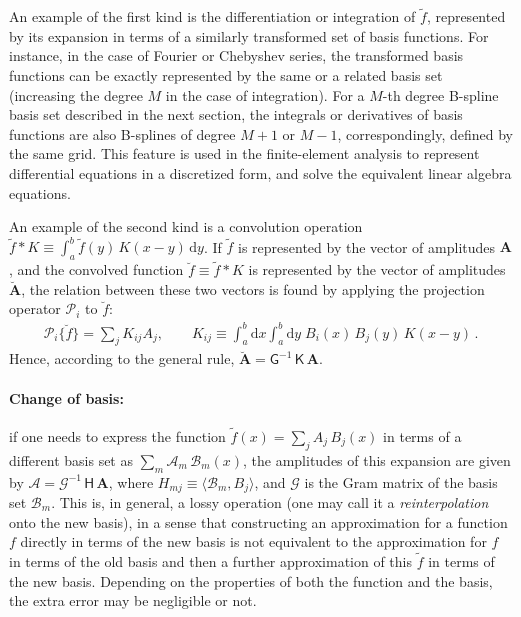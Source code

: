 \documentclass[12pt]{article}
\renewcommand{\d}{\mathrm{d}}
\begin{document}
An example of the first kind is the differentiation or integration of $\tilde f$, represented by its expansion in terms of a similarly transformed set of basis functions. For instance, in the case of Fourier or Chebyshev series, the transformed basis functions can be exactly represented by the same or a related basis set (increasing the degree $M$ in the case of integration). For a $M$-th degree B-spline basis set described in the next section, the integrals or derivatives of basis functions are also B-splines of degree $M+1$ or $M-1$, correspondingly, defined by the same grid. This feature is used in the finite-element analysis to represent differential equations in a discretized form, and solve the equivalent linear algebra equations.

An example of the second kind is a convolution operation $\tilde f \ast K \equiv \int_a^b \tilde f(y)\, K(x-y)\, \d y$. If $\tilde f$ is represented by the vector of amplitudes $\boldsymbol A$, and the convolved function $\breve f \equiv \tilde f \ast K$ is represented by the vector of amplitudes $\boldsymbol{\breve A}$, the relation between these two vectors is found by applying the projection operator $\mathcal P_i$ to $\breve f$:
\begin{align}
\mathcal P_i \{ \breve f \} = \sum_j K_{ij} A_j, \qquad
K_{ij} \equiv \int_a^b \d x \int_a^b \d y\; B_i(x)\, B_j(y)\, K(x-y) \,.
\end{align}
Hence, according to the general rule, $\boldsymbol{\breve A} = \mathsf G^{-1} \, \mathsf K\, \boldsymbol A$.

\paragraph{Change of basis:}  \label{sec:MathBasisSetChange}
if one needs to express the function $\tilde f(x) = \sum_j A_j\, B_j(x)$ in terms of a different basis set as $\sum_m \mathcal A_m\, \mathcal B_m(x)$, the amplitudes of this expansion are given by $\boldsymbol{\mathcal A} = \mathcal G^{-1}\, \mathsf H\, \boldsymbol A$, where $H_{mj} \equiv \langle \mathcal B_m, B_j \rangle$, and $\mathcal G$ is the Gram matrix of the basis set $\mathcal B_m$. This is, in general, a lossy operation (one may call it a \textit{reinterpolation} onto the new basis), in a sense that constructing an approximation for a function $f$ directly in terms of the new basis is not equivalent to the approximation for $f$ in terms of the old basis and then a further approximation of this $\tilde f$ in terms of the new basis. Depending on the properties of both the function and the basis, the extra error may be negligible or not.
\end{document}
